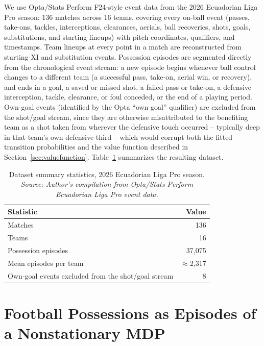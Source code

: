 \documentclass[11pt]{article}
\theoremstyle{plain}
\theoremstyle{definition}
\theoremstyle{remark}
\begin{document}
We use Opta/Stats Perform F24-style event data from the 2026 Ecuadorian Liga Pro season: 136 matches across 16 teams, covering every on-ball event (passes, take-ons, tackles, interceptions, clearances, aerials, ball recoveries, shots, goals, substitutions, and starting lineups) with pitch coordinates, qualifiers, and timestamps. Team lineups at every point in a match are reconstructed from starting-XI and substitution events. Possession episodes are segmented directly from the chronological event stream: a new episode begins whenever ball control changes to a different team (a successful pass, take-on, aerial win, or recovery), and ends in a goal, a saved or missed shot, a failed pass or take-on, a defensive interception, tackle, clearance, or foul conceded, or the end of a playing period. Own-goal events (identified by the Opta ``own goal'' qualifier) are excluded from the shot/goal stream, since they are otherwise misattributed to the benefiting team as a shot taken from wherever the defensive touch occurred -- typically deep in that team's own defensive third -- which would corrupt both the fitted transition probabilities and the value function described in Section~\ref{sec:valuefunction}. Table~\ref{tab:dataset} summarizes the resulting dataset.

\begin{table}[htbp]
\centering
\caption{Dataset summary statistics, 2026 Ecuadorian Liga Pro season.\\[4pt]{\footnotesize\textit{Source: Author's compilation from Opta/Stats Perform Ecuadorian Liga Pro event data.}}}
\label{tab:dataset}
\begin{tabular}{@{}lr@{}}
\toprule
Statistic & Value \\
\midrule
Matches & 136 \\
Teams & 16 \\
Possession episodes & 37{,}075 \\
Mean episodes per team & $\approx$2{,}317 \\
Own-goal events excluded from the shot/goal stream & 8 \\
\bottomrule
\end{tabular}
\end{table}

\section{Football Possessions as Episodes of a Nonstationary MDP}
\label{sec:mdp}
\end{document}
